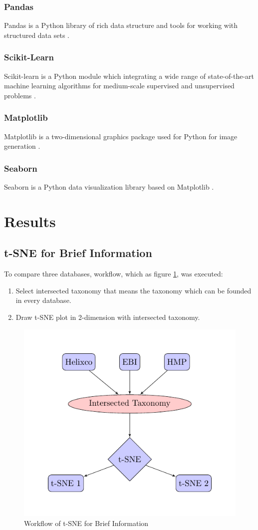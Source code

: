 \documentclass[a4paper]{article}
\begin{document}
            \subsubsection{Pandas}
                Pandas is a Python library of rich data structure and tools for working with structured data sets \cite{pandas1}.

            \subsubsection{Scikit-Learn}
                Scikit-learn is a Python module which integrating a wide range of state-of-the-art machine learning algorithms for medium-scale supervised and unsupervised problems \cite{sklearn1}.

            \subsubsection{Matplotlib}
                Matplotlib is a two-dimensional graphics package used for Python for image generation \cite{matplotlib1}.

            \subsubsection{Seaborn}
                Seaborn is a Python data visualization library based on Matplotlib \cite{seaborn1}.

    \section{Results}
        \subsection{t-SNE for Brief Information}
            To compare three databases, workflow, which as figure \ref{fig:workflow-brief}, was executed:
            \begin{enumerate}
                \item Select intersected taxonomy that means the taxonomy which can be founded in every database.
                \item Draw t-SNE plot in 2-dimension with intersected taxonomy.
            \end{enumerate}

            \begin{figure}[p]
                \centering
                \includegraphics[width=0.3 \linewidth]{figures/tikz/brief.pdf}
                \caption{Workflow of t-SNE for Brief Information}
                \label{fig:workflow-brief}
            \end{figure}
\end{document}
